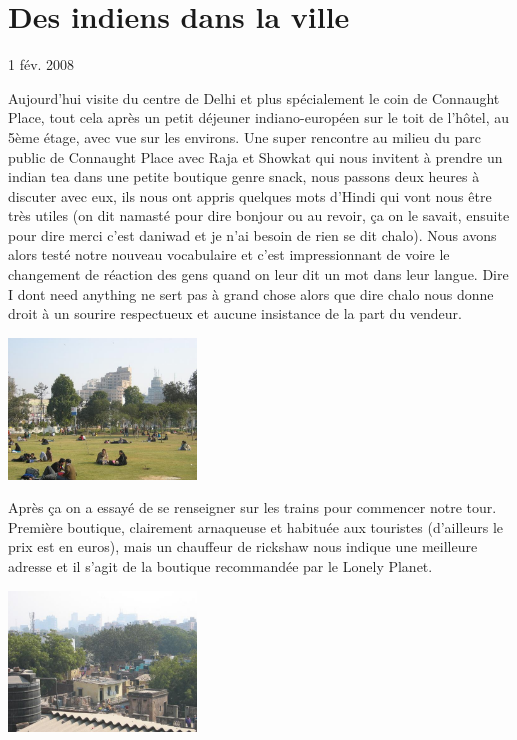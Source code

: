 \section{Des indiens dans la ville}

1 fév. 2008

\begin{multicols}{2}


Aujourd'hui visite du centre de Delhi et plus spécialement le coin de Connaught Place, tout cela après un petit déjeuner indiano-européen sur le toit de l’hôtel, au 5ème étage, avec vue sur les environs. Une super rencontre au milieu du parc public de Connaught Place avec Raja et Showkat qui nous invitent à prendre un indian tea dans une petite boutique genre snack, nous passons deux heures à discuter avec eux, ils nous ont appris quelques mots d’Hindi qui vont nous être très utiles (on dit namasté pour dire bonjour ou au revoir, ça on le savait, ensuite pour dire merci c’est daniwad et je n’ai besoin de rien se dit chalo). Nous avons alors testé notre nouveau vocabulaire et c’est impressionnant de voire le changement de réaction des gens quand on leur dit un mot dans leur langue. Dire I dont need anything ne sert pas à grand chose alors que dire chalo nous donne droit à un sourire respectueux et aucune insistance de la part du vendeur.

\smallbreak
\hspace*{-0.65cm}
\includegraphics[width=5cm]{articles/Des-indiens-dans-la-ville/connaughtplace.jpg}
\smallbreak


Après ça on a essayé de se renseigner sur les trains pour commencer notre tour.
Première boutique, clairement arnaqueuse et habituée aux touristes (d’ailleurs le prix est en euros), mais un chauffeur de rickshaw nous indique une meilleure adresse et il s’agit de la boutique recommandée par le Lonely Planet.

\smallbreak
\hspace*{-0.65cm}
\includegraphics[width=5cm]{articles/Des-indiens-dans-la-ville/toithotel.jpg}
\smallbreak


\end{multicols}
